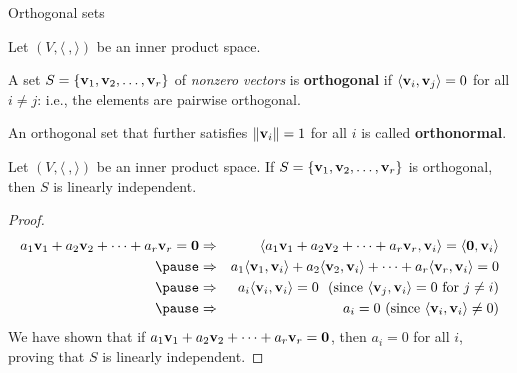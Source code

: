 \begin{frame}{Orthogonal sets}
\begin{definition}
Let $(V,\langle \ , \rangle)$ be an inner product space. 

A set $S=\{{\mathbf v}_1,{\mathbf v}_2,\dots,{\mathbf v}_r\}$ of {\em nonzero vectors} is {\bf orthogonal} if $\langle{\mathbf v}_i,{\mathbf v}_j\rangle=0$ for all $i\ne j$: i.e., the elements are pairwise orthogonal. 

An orthogonal set that further satisfies $\left\lVert{\mathbf v}_i\right\rVert=1$ for all $i$ is called {\bf orthonormal}.   
\end{definition}
\pause
\begin{theorem}
Let $(V,\langle\ , \rangle)$ be an inner product space. If $S=\{{\mathbf v}_1,{\mathbf v}_2,\dots,{\mathbf v}_r\}$ is orthogonal, then $S$ is linearly independent. 
\end{theorem}
\pause
\begin{proof}
\begin{eqnarray*}
a_1\boldv_1 +a_2\boldv_2+\cdots +a_r\boldv_r=\boldzero&\Rightarrow& \langle a_1\boldv_1 +a_2\boldv_2 +\cdots +a_r\boldv_r,\boldv_i\rangle=\langle\boldzero,\boldv_i\rangle \\
\pause&\Rightarrow& a_1\langle\boldv_1,\boldv_i\rangle +a_2\langle \boldv_2,\boldv_i\rangle +\cdots +a_r\langle\boldv_r,\boldv_i\rangle=0 \\
\pause&\Rightarrow& a_i\langle \boldv_i,\boldv_i\rangle=0 \ \text{ (since $\langle\boldv_j,\boldv_i\rangle= 0$ for $j\ne i$)}\\
\pause&\Rightarrow& a_i=0  \text{ (since $\langle\boldv_i,\boldv_i\rangle\ne 0$)}
\end{eqnarray*}
We have shown that if $a_1{\mathbf v}_1+a_2{\mathbf v}_2+\cdots +a_r{\mathbf v}_r={\mathbf 0}$, then $a_i=0$ for all $i$, proving that $S$ is linearly independent. 
\end{proof}
\end{frame}

